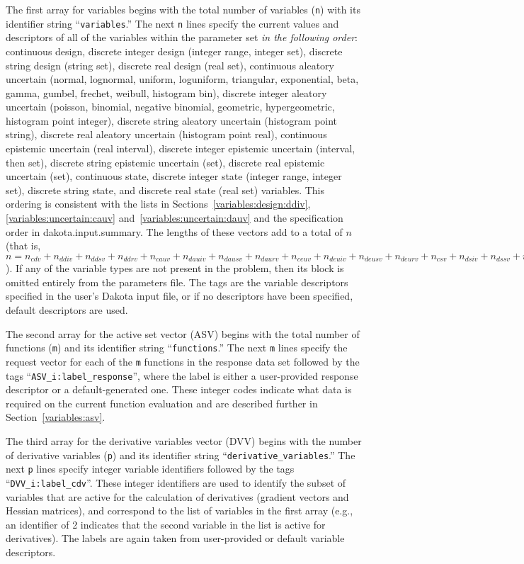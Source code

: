 The first array for variables begins with the total number of
variables (\texttt{n}) with its identifier string
``\texttt{variables}.''  The next \texttt{n} lines specify the current
values and descriptors of all of the variables within the parameter
set \emph{in the following order}: continuous design, discrete integer
design (integer range, integer set), discrete string design (string
set), discrete real design (real set), continuous aleatory uncertain
(normal, lognormal, uniform, loguniform, triangular, exponential,
beta, gamma, gumbel, frechet, weibull, histogram bin), discrete
integer aleatory uncertain (poisson, binomial, negative binomial,
geometric, hypergeometric, histogram point integer), discrete string
aleatory uncertain (histogram point string), discrete real aleatory
uncertain (histogram point real), continuous epistemic uncertain (real
interval), discrete integer epistemic uncertain (interval, then set),
discrete string epistemic uncertain (set), discrete real epistemic
uncertain (set), continuous state, discrete integer state (integer
range, integer set), discrete string state, and discrete real state
(real set) variables. This ordering is consistent with the lists in
Sections~\ref{variables:design:ddiv}, \ref{variables:uncertain:cauv}
and~\ref{variables:uncertain:dauv} and the specification order in
dakota.input.summary.  The lengths of these vectors add to a total of
$n$ (that is, $n = n_{cdv} + n_{ddiv} + n_{ddsv} + n_{ddrv} + n_{cauv}
+ n_{dauiv} + n_{dausv} + n_{daurv} + n_{ceuv} + n_{deuiv} + n_{deusv}
+ n_{deurv} + n_{csv} + n_{dsiv} + n_{dssv} + n_{dsrv}$).  If any of
the variable types are not present in the problem, then its block is
omitted entirely from the parameters file.  The tags are the variable
descriptors specified in the user's Dakota input file, or if no
descriptors have been specified, default descriptors are used.

The second array for the active set vector (ASV) begins with the total
number of functions (\texttt{m}) and its identifier string
``\texttt{functions}.'' The next \texttt{m} lines specify the request
vector for each of the \texttt{m} functions in the response data set
followed by the tags ``\texttt{ASV\_i:label\_response}'', where the
label is either a user-provided response descriptor or a
default-generated one. These integer codes indicate what data is
required on the current function evaluation and are described further
in Section~\ref{variables:asv}.

The third array for the derivative variables vector (DVV) begins with
the number of derivative variables (\texttt{p}) and its identifier
string ``\texttt{derivative\_variables}.'' The next \texttt{p} lines
specify integer variable identifiers followed by the tags
``\texttt{DVV\_i:label\_cdv}''.  These integer identifiers are used to
identify the subset of variables that are active for the calculation
of derivatives (gradient vectors and Hessian matrices), and correspond
to the list of variables in the first array (e.g., an identifier of 2
indicates that the second variable in the list is active for
derivatives).  The labels are again taken from user-provided or
default variable descriptors.

